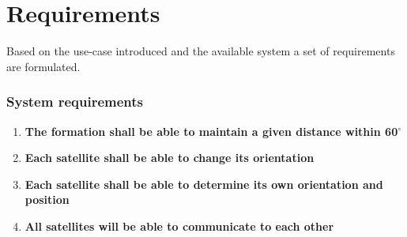 \chapter{Requirements}\label{chap:requirements}
Based on the use-case introduced and the available system a set of requirements are formulated.
%
\subsection*{System requirements}
%
\begin{enumerate}
	\item \textbf{The formation shall be able to maintain a given distance within 60$^{\circ}$} 
		\item \textbf{Each satellite shall be able to change its orientation}
		\item \textbf{Each satellite shall be able to determine its own orientation and position}		\item \textbf{All satellites will be able to communicate to each other}
\end{enumerate}

